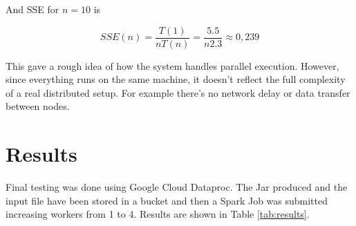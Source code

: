 \documentclass[conference]{IEEEtran}
\begin{document}
And SSE for $n=10$ is 

\begin{equation}
    SSE(n) = \frac{T(1)}{nT(n)} = \frac{5.5}{n 2.3} \approx 0,239
\end{equation}

This gave a rough idea of how the system handles parallel execution. However, since everything runs on the same machine, it doesn't reflect the full complexity of a real distributed setup. For example there’s no network delay or data transfer between nodes.

\section{Results}
Final testing was done using Google Cloud Dataproc. The Jar produced and the input file have been stored in a bucket and then a Spark Job was submitted increasing workers from 1 to 4. Results are shown in Table \ref{tab:results}.

\end{document}
